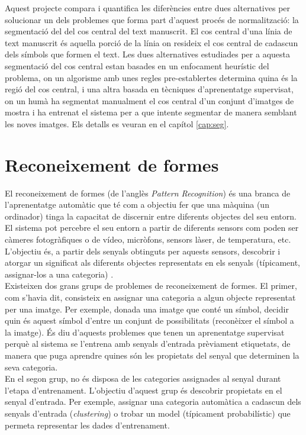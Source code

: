 Aquest projecte compara i quantifica les diferències entre dues alternatives per solucionar un dels problemes que forma part d'aquest procés de normalització: la segmentació del del cos central del text manuscrit. El cos central d'una línia de text manuscrit és aquella porció de la línia on resideix el cos central de cadascun dels símbols que formen el text. Les dues alternatives estudiades per a aquesta segmentació del cos central estan basades en un enfocament heurístic del problema, on un algorisme amb unes regles pre-establertes determina quina és la regió del cos central, i una altra basada en tècniques d'aprenentatge supervisat, on un humà ha segmentat manualment el cos central d'un conjunt d'imatges de mostra i ha entrenat el sistema per a que intente segmentar de manera semblant les noves imatges. Els detalls es veuran en el capítol \ref{cap:seg}.


\section{Reconeixement de formes}
El reconeixement de formes (de l'anglès \emph{Pattern Recognition}) és una branca de l'aprenentatge automàtic que té com a objectiu fer que una màquina (un ordinador) tinga la capacitat de discernir entre diferents objectes del seu entorn. El sistema pot percebre el seu entorn a partir de diferents sensors com poden ser càmeres fotogràfiques o de vídeo, micròfons, sensors làser, de temperatura, etc. L'objectiu és, a partir dels senyals obtinguts per aquests sensors, descobrir i atorgar un significat als diferents objectes representats en els senyals (típicament, assignar-los a una categoria) \cite{DH73}.\\

Existeixen dos grans grups de problemes de reconeixement de formes. El primer, com s'havia dit, consisteix en assignar una categoria a algun objecte representat per una imatge. Per exemple, donada una imatge que conté un símbol, decidir quin és aquest símbol d'entre un conjunt de possibilitats (reconèixer el símbol a la imatge). És diu d'aquests problemes que tenen un aprenentatge supervisat perquè al sistema se l'entrena amb senyals d'entrada prèviament etiquetats, de manera que puga aprendre quines són les propietats del senyal que determinen la seva categoria.\\

En el segon grup, no és disposa de les categories assignades al senyal durant l'etapa d'entrenament. L'objectiu d'aquest grup és descobrir propietats en el senyal d'entrada. Per exemple, assignar una categoria automàtica a cadascun dels senyals d'entrada (\emph{clustering}) o trobar un model (típicament probabilístic) que permeta representar les dades d'entrenament. \\

